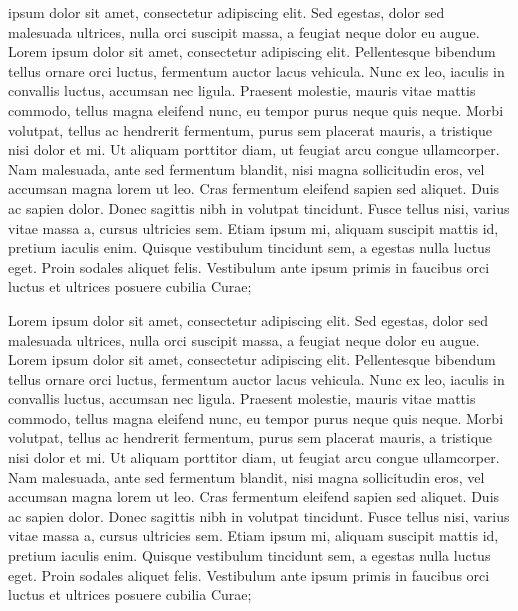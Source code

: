\documentclass[a4paper]{article}
\begin{document}
\begin{pairs}\sloppy
\begin{Leftside} 
    \beginnumbering
               \pstart
{} ipsum  dolor sit amet, consectetur adipiscing elit. Sed   egestas, dolor sed malesuada ultrices, nulla orci  suscipit massa, a feugiat neque dolor eu augue.  Lorem ipsum dolor sit amet, consectetur adipiscing  elit. Pellentesque bibendum  tellus ornare orci luctus, fermentum auctor lacus vehicula. Nunc ex leo, iaculis in  convallis  luctus, accumsan nec ligula. Praesent molestie, mauris vitae mattis commodo, tellus magna  eleifend nunc, eu tempor purus neque quis neque. Morbi volutpat, tellus ac hendrerit fermentum, purus sem placerat mauris, a tristique nisi dolor et mi. Ut aliquam porttitor diam, ut  feugiat arcu congue ullamcorper. Nam malesuada, ante sed fermentum blandit, nisi magna sollicitudin eros, vel accumsan magna lorem ut leo. Cras fermentum eleifend sapien sed aliquet. Duis ac sapien dolor. Donec sagittis nibh in volutpat tincidunt. Fusce tellus nisi, varius vitae massa a, cursus ultricies sem. Etiam ipsum mi, aliquam suscipit mattis id, pretium iaculis enim. Quisque vestibulum tincidunt sem, a egestas nulla  luctus eget. Proin sodales aliquet felis.  Vestibulum ante ipsum primis in faucibus orci luctus et  ultrices posuere cubilia Curae;

        \pend



        \pstart
Lorem ipsum dolor sit amet, consectetur adipiscing elit. Sed egestas, dolor sed malesuada ultrices, nulla orci suscipit massa, a feugiat neque dolor eu augue. Lorem ipsum dolor sit amet, consectetur adipiscing elit. Pellentesque bibendum tellus ornare orci luctus, fermentum auctor lacus vehicula. Nunc ex leo, iaculis in convallis luctus, accumsan nec ligula. Praesent molestie, mauris vitae mattis commodo, tellus magna eleifend nunc, eu tempor purus neque quis neque. Morbi volutpat, tellus ac hendrerit fermentum, purus sem placerat mauris, a tristique nisi dolor et mi. Ut aliquam porttitor diam, ut feugiat arcu congue ullamcorper. Nam malesuada, ante sed fermentum blandit, nisi magna sollicitudin eros, vel accumsan magna lorem ut leo. Cras fermentum eleifend sapien sed aliquet. Duis ac sapien dolor. Donec sagittis nibh in volutpat tincidunt. Fusce tellus nisi, varius vitae massa a, cursus ultricies sem. Etiam ipsum mi, aliquam suscipit mattis id, pretium iaculis enim. Quisque vestibulum tincidunt sem, a egestas nulla luctus eget. Proin sodales aliquet felis. Vestibulum ante ipsum primis in faucibus orci luctus et ultrices posuere cubilia Curae;
\pend
  \end{Leftside}


\end{pairs}
\end{document}
